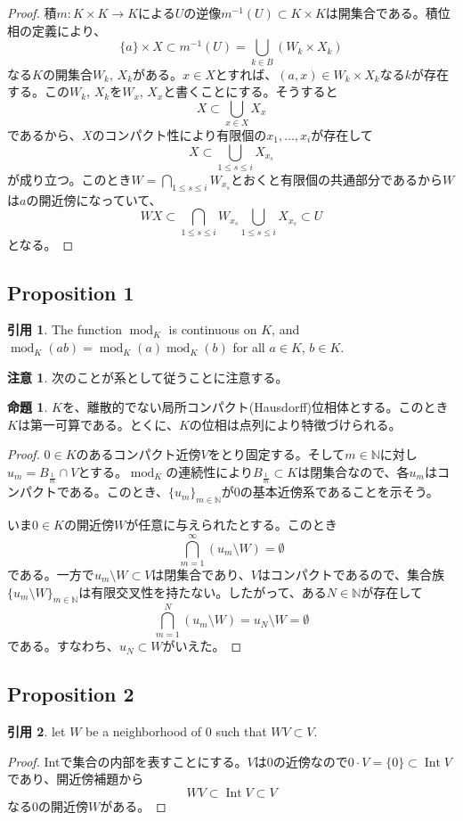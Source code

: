\documentclass[12pt]{jsarticle}%
\renewenvironment{leftbar}{%
  \renewcommand\FrameCommand{\vrule width 1pt \hspace{10pt}}%
  \MakeFramed {\advance\hsize-\width \FrameRestore}}%
 {\endMakeFramed}
\newcommand{\barquo}[1]{\begin{leftbar} \begin{quo} #1 \end{quo} \end{leftbar}}%
\newcommand{\bfsubsection}[1]{\subsection*{\textbf{#1}}}
\theoremstyle{definition}%
\newtheorem*{proposition}{命題}
\newcommand{\prop}[1]{\begin{oframed} \begin{proposition} #1 \end{proposition} \end{oframed}}%
\newtheorem*{rem}{注意}
\newtheorem*{quo}{引用}
\DeclareMathOperator{\module}{mod}%
\DeclareMathOperator{\Int}{Int}
\newcommand{\bbn}{{\mathbb N}}
\newcommand{\N}{\bbn}
\begin{document}
\begin{proof}
積$m \colon K \times K \rightarrow K$による$U$の逆像$m^{-1}(U) \subset K \times K$は開集合である。積位相の定義により、
\[
\{ a \} \times X \subset m^{-1}(U) = \bigcup_{k \in B}(W_k \times X_k)
\]
なる$K$の開集合$W_k$, $X_k$がある。$x \in X$とすれば、$(a,x) \in W_k \times X_k$なる$k$が存在する。この$W_k$, $X_k$を$W_x$, $X_x$と書くことにする。そうすると
\[
X \subset \bigcup_{x \in X}X_x
\]
であるから、$X$のコンパクト性により有限個の$x_1, \ldots , x_i$が存在して
\[
X \subset \bigcup_{1 \leq s \leq i}X_{x_s}
\]
が成り立つ。このとき$W = \bigcap_{1 \leq s \leq i}W_{x_s}$とおくと有限個の共通部分であるから$W$は$a$の開近傍になっていて、
\[
WX \subset  \bigcap_{1 \leq s \leq i}W_{x_s}　\bigcup_{1 \leq s \leq i}X_{x_s} \subset U
\]
となる。
\end{proof}


\bfsubsection{Proposition 1}
\barquo{
The function $\module_K$ is continuous on $K$, and $\module_K(ab) = \module_K(a)\module_K(b)$ for all $a\in K $, $b \in K$.
}
\begin{rem}
  次のことが系として従うことに注意する。
\end{rem}

\prop{
  $K$を、離散的でない局所コンパクト(Hausdorff)位相体とする。このとき$K$は第一可算である。とくに、$K$の位相は点列により特徴づけられる。
}

\begin{proof}
$0 \in K$のあるコンパクト近傍$V$をとり固定する。そして$m \in \N$に対し$u_m = B_{\frac{1}{m}} \cap V$とする。$\module_K$の連続性により$B_{\frac{1}{m}} \subset K$は閉集合なので、各$u_m$はコンパクトである。このとき、$\{ u_m \}_{m \in \N}$が$0$の基本近傍系であることを示そう。

いま$0 \in K$の開近傍$W$が任意に与えられたとする。このとき
\[
\bigcap_{m=1}^{\infty} (u_m \setminus W) = \emptyset
\]
である。一方で$u_m \setminus W \subset V$は閉集合であり、$V$はコンパクトであるので、集合族$\{ u_m \setminus W \}_{m \in \N}$は有限交叉性を持たない。したがって、ある$N \in \N$が存在して
\[
\bigcap_{m=1}^{N} (u_m \setminus W) = u_N \setminus W = \emptyset
\]
である。すなわち、$u_N \subset W$がいえた。

\end{proof}




\bfsubsection{Proposition 2}
\barquo{
let $W$ be a neighborhood of $0$ such that $WV \subset V$.
}
\begin{proof}
  Intで集合の内部を表すことにする。$V$は0の近傍なので$0 \cdot V = \{0 \} \subset \Int V$であり、開近傍補題から
  \[
  WV \subset \Int V \subset V
  \]
  なる0の開近傍$W$がある。
\end{proof}
\end{document}
